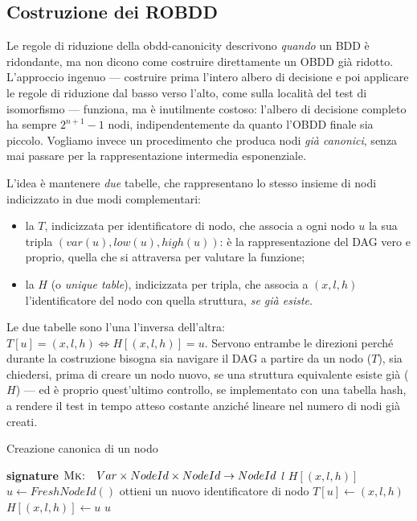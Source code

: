 \subsection{Costruzione dei ROBDD}

Le regole di riduzione della obdd-canonicity descrivono \emph{quando} un BDD è ridondante, ma non dicono come costruire direttamente un OBDD già ridotto. L'approccio ingenuo — costruire prima l'intero albero di decisione e poi applicare le regole di riduzione dal basso verso l'alto, come sulla località del test di isomorfismo — funziona, ma è inutilmente costoso: l'albero di decisione completo ha sempre \(2^{n+1}-1\) nodi, indipendentemente da quanto l'OBDD finale sia piccolo. Vogliamo invece un procedimento che produca nodi \emph{già canonici}, senza mai passare per la rappresentazione intermedia esponenziale.

L'idea è mantenere \emph{due} tabelle, che rappresentano lo stesso insieme di nodi indicizzato in due modi complementari:
\begin{itemize}
  \item la  \(T\), indicizzata per identificatore di nodo, che associa a ogni nodo \(u\) la sua tripla \((var(u), low(u), high(u))\): è la rappresentazione del DAG vero e proprio, quella che si attraversa per valutare la funzione;
  \item la  \(H\) (o \emph{unique table}), indicizzata per tripla, che associa a \((x,l,h)\) l'identificatore del nodo con quella struttura, \emph{se già esiste}.
\end{itemize}
Le due tabelle sono l'una l'inversa dell'altra: \(T[u] = (x,l,h) \iff H[(x,l,h)] = u\). Servono entrambe le direzioni perché durante la costruzione bisogna sia navigare il DAG a partire da un nodo (\(T\)), sia chiedersi, prima di creare un nodo nuovo, se una struttura equivalente esiste già (\(H\)) — ed è proprio quest'ultimo controllo, se implementato con una tabella hash, a rendere il test in tempo atteso costante anziché lineare nel numero di nodi già creati.

\begin{algorithmdesc}{Creazione canonica di un nodo}
  \begin{algorithmic}[1]
    \Statex{} \textbf{signature} \(\textsc{Mk:} \quad Var \times NodeId \times NodeId \to NodeId\)
    \State{} \Return{} \(l\)
    \State{} \Return{} \(H[(x,l,h)]\)
    \Else{}
    \State{} \(u \gets FreshNodeId()\) \Comment{} ottieni un nuovo identificatore di nodo
    \State{} \(T[u] \gets (x,l,h)\)
    \State{} \(H[(x,l,h)] \gets u\)
    \State{} \Return{} \(u\)
    \EndIf{}
    \EndFunction{}
  \end{algorithmic}
\end{algorithmdesc}

